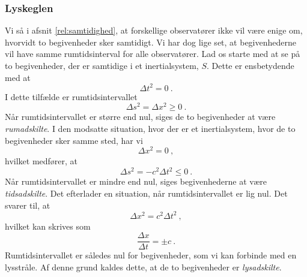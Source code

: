 



\subsubsection{Lyskeglen} \label{sec:Lyskeglen}
Vi så i afsnit \ref{rel:samtidighed}, at forskellige observatører ikke vil være enige om, hvorvidt to begivenheder sker samtidigt.
Vi har dog lige set, at begivenhederne vil have samme rumtidsinterval for alle observatører.
Lad os starte med at se på to begivenheder, der er samtidige i et inertialsystem, $S$.
Dette er ensbetydende med at 
$$
\Delta t^2=0 \: .
$$
I dette tilfælde er rumtidsintervallet
$$
\Delta s^2 = \Delta x^2\geq 0 \: .
$$
Når rumtidsintervallet er større end nul, siges de to begivenheder at være \emph{rumadskilte}.
I den modsatte situation, hvor der er et inertialsystem, hvor de to begivenheder sker samme sted, har vi
$$
\Delta x^2=0 \: ,
$$
hvilket medfører, at
$$
\Delta s^2=-c^2\Delta t^2\leq 0 \: .
$$
Når rumtidsintervallet er mindre end nul, siges begivenhederne at være \emph{tidsadskilte}.
Det efterlader en situation, når rumtidsintervallet er lig nul.
Det svarer til, at
$$
\Delta x^2=c^2\Delta t^2 \: ,
$$
hvilket kan skrives som
$$
\frac{\Delta x}{\Delta t}=\pm c \: .
$$
Rumtidsintervallet er således nul for begivenheder, som vi kan forbinde med en lysstråle.
Af denne grund kaldes dette, at de to begivenheder er \emph{lysadskilte}.

